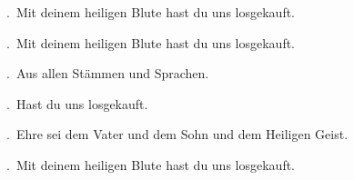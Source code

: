 \Rbar.~Mit deinem heiligen Blute \GreStar{} hast du uns losgekauft.

\Rbar.~Mit deinem heiligen Blute \GreStar{} hast du uns losgekauft.

\Vbar.~Aus allen Stämmen und Sprachen. 

\Rbar.~Hast du uns losgekauft.

\Vbar.~Ehre sei dem Vater und dem Sohn und dem Heiligen Geist.

\Rbar.~Mit deinem heiligen Blute \GreStar{} hast du uns losgekauft.
